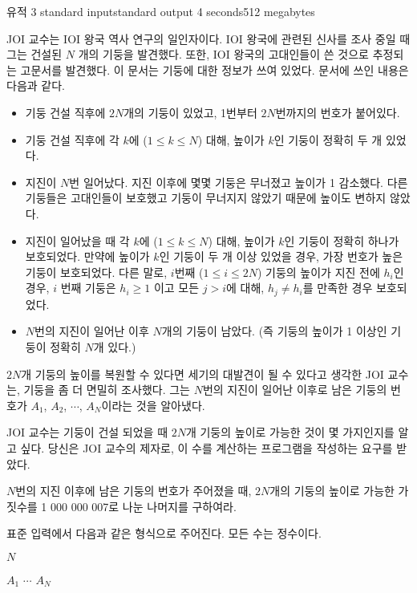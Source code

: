 \begin{problem}{유적 3}
	{standard input}{standard output}
	{4 seconds}{512 megabytes}{}
	
	JOI 교수는 IOI 왕국 역사 연구의 일인자이다. IOI 왕국에 관련된 신사를 조사 중일 때 그는 건설된 $N$ 개의 기둥을 발견했다. 또한, IOI 왕국의 고대인들이 쓴 것으로 추정되는 고문서를 발견했다. 이 문서는 기둥에 대한 정보가 쓰여 있었다. 문서에 쓰인 내용은 다음과 같다.
	
	\begin{itemize}
		\item 기둥 건설 직후에 $2N$개의 기둥이 있었고, 1번부터 $2N$번까지의 번호가 붙어있다.
		\item 기둥 건설 직후에 각 $k$에 ($1 \le k \le N$) 대해, 높이가 $k$인 기둥이 정확히 두 개 있었다.
		\item 지진이 $N$번 일어났다. 지진 이후에 몇몇 기둥은 무너졌고 높이가 1 감소했다. 다른 기둥들은 고대인들이 보호했고 기둥이 무너지지 않았기 때문에 높이도 변하지 않았다.
		\item 지진이 일어났을 때 각 $k$에 ($1 \le k \le N$) 대해, 높이가 $k$인 기둥이 정확히 하나가 보호되었다. 만약에 높이가 $k$인 기둥이 두 개 이상 있었을 경우, 가장 번호가 높은 기둥이 보호되었다. 다른 말로, $i$번째 ($1 \le i \le 2N$) 기둥의 높이가 지진 전에 $h_i$인 경우, $i$ 번째 기둥은 $h_i \ge 1$ 이고 모든 $j>i$에 대해, $h_j \ne h_i$를 만족한 경우 보호되었다.
		\item $N$번의 지진이 일어난 이후 $N$개의 기둥이 남았다. (즉 기둥의 높이가 1 이상인 기둥이 정확히 $N$개 있다.)
	\end{itemize}

	$2N$개 기둥의 높이를 복원할 수 있다면 세기의 대발견이 될 수 있다고 생각한 JOI 교수는, 기둥을 좀 더 면밀히 조사했다. 그는 $N$번의 지진이 일어난 이후로 남은 기둥의 번호가 $A_1$, $A_2$, $\cdots$, $A_N$이라는 것을 알아냈다.
	
	JOI 교수는 기둥이 건설 되었을 때 $2N$개 기둥의 높이로 가능한 것이 몇 가지인지를 알고 싶다. 당신은 JOI 교수의 제자로, 이 수를 계산하는 프로그램을 작성하는 요구를 받았다.
	
	$N$번의 지진 이후에 남은 기둥의 번호가 주어졌을 때, $2N$개의 기둥의 높이로 가능한 가짓수를 1 000 000 007로 나눈 나머지를 구하여라.
	
	\InputFile
	
	표준 입력에서 다음과 같은 형식으로 주어진다. 모든 수는 정수이다.
	
	$N$
	
	$A_1$ $\cdots$ $A_N$
	
	\OutputFile
	

\end{problem}
